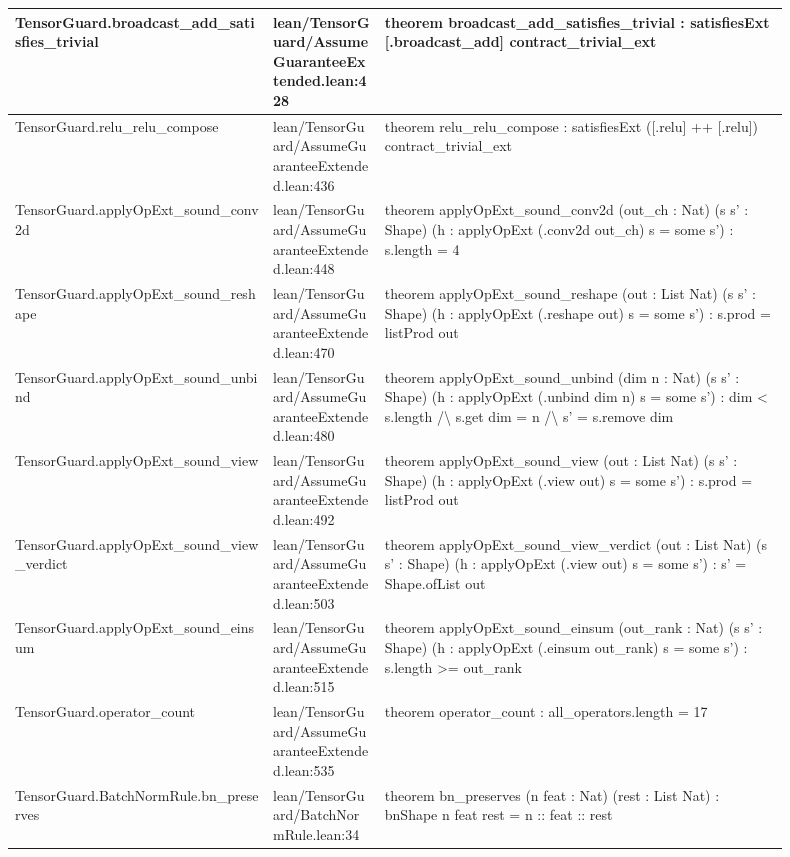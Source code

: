 \documentclass[10pt]{article}
\begin{document}
\begin{longtable}{|p{0.30\linewidth}|p{0.13\linewidth}|p{0.47\linewidth}|}
\hline
TensorGuard.broadcast\_add\_satisfies\_trivial & lean/TensorGuard/AssumeGuaranteeExtended.lean:428 & theorem broadcast\_add\_satisfies\_trivial : satisfiesExt [.broadcast\_add] contract\_trivial\_ext \\
\hline
TensorGuard.relu\_relu\_compose & lean/TensorGuard/AssumeGuaranteeExtended.lean:436 & theorem relu\_relu\_compose : satisfiesExt ([.relu] ++ [.relu]) contract\_trivial\_ext \\
\hline
TensorGuard.applyOpExt\_sound\_conv2d & lean/TensorGuard/AssumeGuaranteeExtended.lean:448 & theorem applyOpExt\_sound\_conv2d (out\_ch : Nat) (s s' : Shape) (h : applyOpExt (.conv2d out\_ch) s = some s') : s.length = 4 \\
\hline
TensorGuard.applyOpExt\_sound\_reshape & lean/TensorGuard/AssumeGuaranteeExtended.lean:470 & theorem applyOpExt\_sound\_reshape (out : List Nat) (s s' : Shape) (h : applyOpExt (.reshape out) s = some s') : s.prod = listProd out \\
\hline
TensorGuard.applyOpExt\_sound\_unbind & lean/TensorGuard/AssumeGuaranteeExtended.lean:480 & theorem applyOpExt\_sound\_unbind (dim n : Nat) (s s' : Shape) (h : applyOpExt (.unbind dim n) s = some s') : dim < s.length /\textbackslash{} s.get dim = n /\textbackslash{} s' = s.remove dim \\
\hline
TensorGuard.applyOpExt\_sound\_view & lean/TensorGuard/AssumeGuaranteeExtended.lean:492 & theorem applyOpExt\_sound\_view (out : List Nat) (s s' : Shape) (h : applyOpExt (.view out) s = some s') : s.prod = listProd out \\
\hline
TensorGuard.applyOpExt\_sound\_view\_verdict & lean/TensorGuard/AssumeGuaranteeExtended.lean:503 & theorem applyOpExt\_sound\_view\_verdict (out : List Nat) (s s' : Shape) (h : applyOpExt (.view out) s = some s') : s' = Shape.ofList out \\
\hline
TensorGuard.applyOpExt\_sound\_einsum & lean/TensorGuard/AssumeGuaranteeExtended.lean:515 & theorem applyOpExt\_sound\_einsum (out\_rank : Nat) (s s' : Shape) (h : applyOpExt (.einsum out\_rank) s = some s') : s.length >= out\_rank \\
\hline
TensorGuard.operator\_count & lean/TensorGuard/AssumeGuaranteeExtended.lean:535 & theorem operator\_count : all\_operators.length = 17 \\
\hline
TensorGuard.BatchNormRule.bn\_preserves & lean/TensorGuard/BatchNormRule.lean:34 & theorem bn\_preserves (n feat : Nat) (rest : List Nat) : bnShape n feat rest = n :: feat :: rest \\

\end{longtable}
\end{document}
